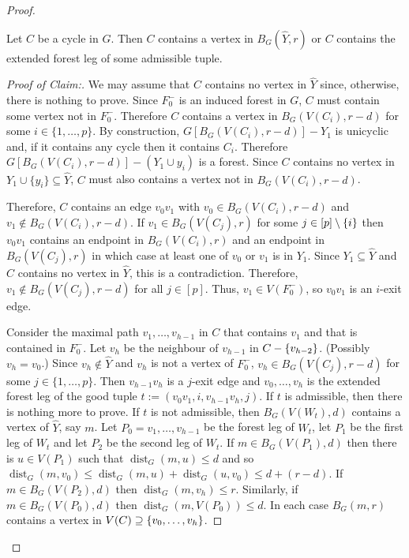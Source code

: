 \documentclass{patmorin}
\newenvironment{clmproof}{\begin{proof}[Proof of Claim:]\renewcommand{\qedsymbol}{\rule{1ex}{1ex}}}{\end{proof}}
\DeclareMathOperator{\dist}{dist}
\DeclarePairedDelimiter\set{\{}{\}}
\begin{document}
\begin{proof}
  \begin{clm}\label{hit_cycle}
    Let $C$ be a cycle in $G$.  Then  $C$ contains a vertex in $B_G(\widehat{Y},r)$ or $C$ contains the extended forest leg of some admissible tuple.
  \end{clm}

  \begin{clmproof}
    We may assume that $C$ contains no vertex in $\widehat{Y}$ since, otherwise, there is nothing to prove. Since $F_0^-$ is an induced forest in $G$, $C$ must contain some vertex not in $F_0^-$.  Therefore $C$ contains a vertex in $B_G(V(C_i),r-d)$  for some $i\in\{1,\ldots,p\}$. By construction, $G[B_G(V(C_i),r-d)]-Y_1$ is unicyclic and, if it contains any cycle then it contains $C_i$.  Therefore  $G[B_G(V(C_i),r-d)]-(Y_1\cup y_i)$ is a forest.  Since $C$ contains no vertex in $Y_1\cup\{y_i\}\subseteq \widehat{Y}$, $C$ must also contains a vertex not in $B_G(V(C_i),r-d)$.

    Therefore, $C$ contains an edge $v_0v_1$ with $v_0\in B_G(V(C_i),r-d)$ and $v_1\not\in B_G(V(C_i),r-d)$. If $v_1\in B_G(V(C_j),r)$ for some $j\in[p]\setminus\set{i}$ then $v_0v_1$ contains an endpoint in $B_G(V(C_i),r)$ and an endpoint in $B_G(V(C_j),r)$ in which case at least one of $v_0$ or $v_1$ is in $Y_1$. Since $Y_1\subseteq \widehat{Y}$ and $C$ contains no vertex in $\widehat{Y}$, this is a contradiction. Therefore, $v_1\not\in B_G(V(C_j),r-d)$ for all $j\in[p]$. Thus, $v_1\in V(F^-_0)$, so $v_0v_1$ is an $i$-exit edge.

    Consider the maximal path $v_1,\ldots,v_{h-1}$ in $C$ that contains $v_1$ and that is contained in $F_0^-$. Let $v_h$ be the neighbour of $v_{h-1}$ in $C-\set{v_{h-2}}$.  (Possibly $v_h=v_0$.)  Since $v_h\notin \widehat{Y}$ and $v_h$ is not a vertex of $F_0^-$, $v_h\in B_G(V(C_j),r-d)$ for some $j\in\{1,\ldots,p\}$.   Then $v_{h-1}v_h$ is a $j$-exit edge and $v_0,\ldots,v_{h}$ is the extended forest leg of the good tuple $t:=(v_0v_1,i,v_{h-1}v_h,j)$.   If $t$ is admissible, then there is nothing more to prove.  If $t$ is not admissible, then $B_G(V(W_t),d)$ contains a vertex of $\widehat{Y}$, say $m$. Let $P_0=v_1,\ldots,v_{h-1}$ be the forest leg of $W_t$, let $P_1$ be the first leg of $W_t$ and let $P_2$ be the second leg of $W_t$. If $m\in B_G(V(P_1),d)$ then there is $u\in V(P_1)$ such that $\dist_G(m,u)\leq d$ and so $\dist_G(m,v_0)\le \dist_G(m,u) + \dist_G(u,v_0)\le d + (r-d)$. If $m\in B_G(V(P_2),d)$ then $\dist_G(m,v_h)\le r$.  Similarly, if $m\in B_G(V(P_0),d)$ then $\dist_G(m,V(P_0))\le d$.  In each case $B_G(m,r)$ contains a vertex in $V(C)\supseteq \set{v_0,\ldots,v_h}$.
  \end{clmproof}


\end{proof}
\end{document}
